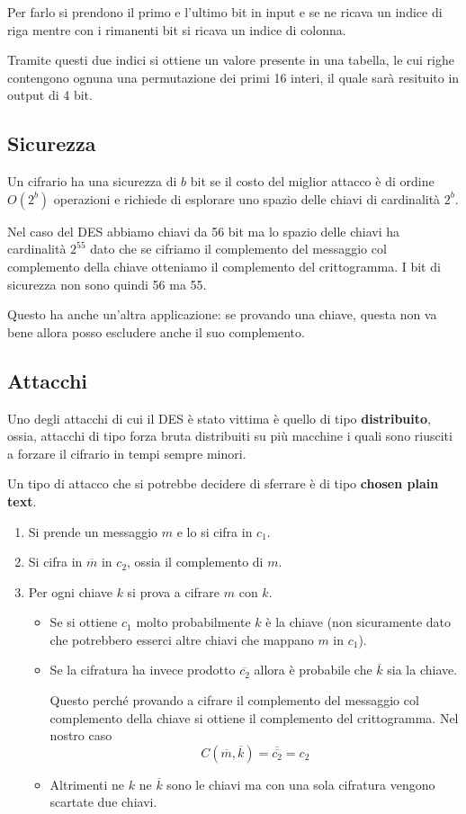 Per farlo si prendono il primo e l'ultimo bit in input e se ne ricava un indice di riga mentre con i rimanenti bit
si ricava un indice di colonna.

Tramite questi due indici si ottiene un valore presente in una tabella, le cui righe contengono ognuna una permutazione
dei primi 16 interi, il quale sar\`a resituito in output di 4 bit.

\subsection{Sicurezza}\label{sicurezza_DES}
Un cifrario ha una sicurezza di $b$ bit se il costo del miglior attacco \`e di ordine $O(2^b)$ operazioni e richiede di
esplorare uno spazio delle chiavi di cardinalit\`a $2^b$.

Nel caso del DES abbiamo chiavi da 56 bit ma lo spazio delle chiavi ha cardinalit\`a $2^{55}$ dato che se cifriamo
il complemento del messaggio col complemento della chiave otteniamo il complemento del crittogramma. I bit di sicurezza
non sono quindi 56 ma 55.

Questo ha anche un'altra applicazione: se provando una chiave, questa non va bene allora posso escludere anche il suo
complemento.

\subsection{Attacchi}\label{attacchi_DES}
Uno degli attacchi di cui il DES \`e stato vittima \`e quello di tipo \textbf{distribuito}, ossia, attacchi di tipo
forza bruta distribuiti su pi\`u macchine i quali sono riusciti a forzare il cifrario in tempi sempre minori.

Un tipo di attacco che si potrebbe decidere di sferrare \`e di tipo \textbf{chosen plain text}.
\begin{enumerate}
	\item Si prende un messaggio $m$ e lo si cifra in $c_1$.
	\item Si cifra in $\overline{m}$ in $c_2$, ossia il complemento di $m$.
	\item Per ogni chiave $k$ si prova a cifrare $m$ con $k$.
	      \begin{itemize}
		      \item Se si ottiene $c_1$ molto probabilmente $k$ \`e la chiave (non sicuramente dato che potrebbero
		            esserci altre chiavi che mappano $m$ in $c_1$).
		      \item Se la cifratura ha invece prodotto $\overline{c_2}$ allora \`e probabile che $\overline{k}$ sia
		            la chiave.

		            Questo perch\'e provando a cifrare il complemento del messaggio col complemento della chiave si
		            ottiene il complemento del crittogramma. Nel nostro caso
		            \[ C(\overline{m}, \overline{k}) = \overline{\overline{c_2}} = c_2 \]
		      \item Altrimenti ne $k$ ne $\overline{k}$ sono le chiavi ma con una sola cifratura vengono scartate
		            due chiavi.
	      \end{itemize}
\end{enumerate}

